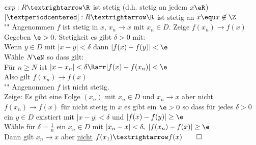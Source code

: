 \bsp
$exp:R→\R$ ist stetig (d.h. stetig an jedem $x\eR$)\\
$[·]:R→\R$ ist stetig an $x \equ x\not\in\Z$\\
%
\bew
"\Rarr" Angenommen $f$ ist stetig in $x$, $x_n→x$ mit $x_n\in D$. Zeige $f(x_n)→f(x)$\\
Gegeben $\e>0$. Stetigkeit \Rarr{} es gibt $\delta>0$ mit:\\
Wenn $y\in D$ mit $|x-y|<\delta$ dann $|f(x)-f(y)|<\e$\\
Wähle $N\eN$ so dass gilt:\\
Für $n\geq N$ ist $|x-x_n|<\delta \Rarr |f(x)-f(x_n)|<\e$\\
Also gilt $f(x_n)→f(x)$\\
"\Larr" Angenommen $f$ ist nicht stetig.\\
Zeige: Es gibt eine Folge $(x_n)$ mit $x_n\in D$ und $x_n→x$ aber nicht $f(x_n)→f(x)$ für nicht stetig in $x$ \Rarr{} es gibt ein $\e>0$ so dass für jedes $\delta>0$ ein $y\in D$ existiert mit $|x-y|<\delta$ und $|f(x)-f(y)|\geq \e$\\
Wähle für $\delta=\frac{1}{n}$ ein $x_n\in D$ mit $|x_n-x|<\delta,\ |f(x_n)-f(x)|\geq\e$\\
Dann gilt $x_n→x$ aber \underline{nicht} $f(x_1)→f(x)\qed$
\bew
